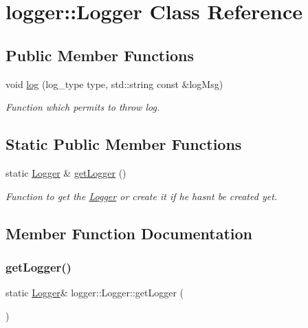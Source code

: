 \hypertarget{classlogger_1_1_logger}{}\section{logger\+:\+:Logger Class Reference}
\label{classlogger_1_1_logger}
\subsection*{Public Member Functions}
\begin{DoxyCompactItemize}
\item 
void \hyperlink{classlogger_1_1_logger_a3277b0828087906e53e8862f021a5822}{log} (log\+\_\+type type, std\+::string const \&log\+Msg)
\begin{DoxyCompactList}\small\item\em Function which permits to throw log. \end{DoxyCompactList}\end{DoxyCompactItemize}
\subsection*{Static Public Member Functions}
\begin{DoxyCompactItemize}
\item 
static \hyperlink{classlogger_1_1_logger}{Logger} \& \hyperlink{classlogger_1_1_logger_a180be762637aa78104430ff2d3a6b427}{get\+Logger} ()
\begin{DoxyCompactList}\small\item\em Function to get the \hyperlink{classlogger_1_1_logger}{Logger} or create it if he hasn\textquotesingle{}t be created yet. \end{DoxyCompactList}\end{DoxyCompactItemize}


\subsection{Member Function Documentation}
\mbox{\label{classlogger_1_1_logger_a180be762637aa78104430ff2d3a6b427}} 
\subsubsection{\texorpdfstring{get\+Logger()}{getLogger()}}
{\footnotesize\ttfamily static \hyperlink{classlogger_1_1_logger}{Logger}\& logger\+::\+Logger\+::get\+Logger (\begin{DoxyParamCaption}{ }\end{DoxyParamCaption})\hspace{0.3cm}{\ttfamily [static]}}



